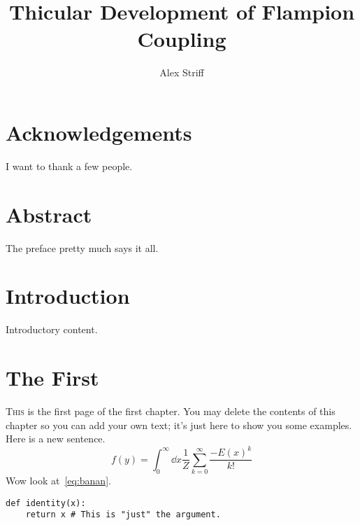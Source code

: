 \documentclass[12pt]{reedthesis}
\title{\textbf{\large
      Thicular Development of Flampion Coupling
    }\ifdraft{\\\textsc{\textbf{Draft}}}{}
    }
\author{Alex Striff}
\date{\ifoptionfinal{May 2021}{\today}}
\theoremstyle{plain}
\theoremstyle{definition}
\begin{document}
\maketitle
{}
\frontmatter
{}
\pagestyle{empty}

\chapter*{Acknowledgements} %
I want to thank a few people.


\chapter*{Abstract}
The preface pretty much says it all.



\mainmatter%
\pagestyle{fancyplain}
\tableofcontents


\chapter*{Introduction}

Introductory content.

\chapter{The First}

\lettrine{T}{his} is the first page of the first chapter. You may delete the
contents of this chapter so you can add your own text; it's just here to show
you some examples. Here is a new sentence.
\begin{equation}
  f(y)
  = \int_0^\infty \dd{x}\frac{1}{Z}\sum_{k=0}^\infty \frac{-{E(x)}^k}{k!}
  \label{eq:banan}
\end{equation}
Wow look at~\cref{eq:banan}.
\begin{verbatim}
def identity(x):
    return x # This is "just" the argument.
\end{verbatim}
\kant%
\end{document}
